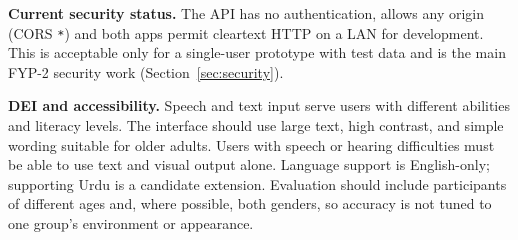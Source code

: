 \textbf{Current security status.} The API has no authentication, allows any
origin (CORS \texttt{*}) and both apps permit cleartext HTTP on a LAN for
development. This is acceptable only for a single-user prototype with test
data and is the main FYP-2 security work (Section~\ref{sec:security}).

\textbf{DEI and accessibility.} Speech and text input serve users with
different abilities and literacy levels. The interface should use large text,
high contrast, and simple wording suitable for older adults. Users with speech
or hearing difficulties must be able to use text and visual output alone.
Language support is English-only; supporting Urdu is a candidate
extension.  Evaluation should include participants of different
ages and, where possible, both genders, so accuracy is not tuned to one
group's environment or appearance.

